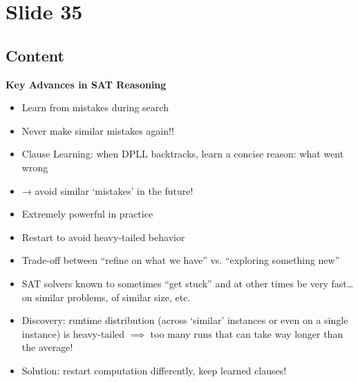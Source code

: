 \documentclass{article}%
\begin{document}
%
\newpage%
\section{Slide 35}%
\label{sec:Slide35}%
\subsection{Content}%

\textbf{Key Advances in SAT Reasoning}

\begin{itemize}
    \item Learn from mistakes during search
    \item Never make similar mistakes again!!
    \item Clause Learning: when DPLL backtracks,
    learn a concise reason: what went wrong
    \item → avoid similar ‘mistakes’ in the future!
    \item Extremely powerful in practice
    \item Restart to avoid heavy-tailed behavior
    \item Trade-off between “refine on what we have” vs. “exploring something new”
    \item SAT solvers known to sometimes “get stuck” and at other times be very fast… on similar problems, of similar size, etc.
    \item Discovery: runtime distribution (across ‘similar’ instances or even on a single instance) is heavy-tailed $\implies$ too many runs that can take way longer than the average!
    \item Solution: restart computation differently, keep learned clauses!
\end{itemize}
\end{document}
